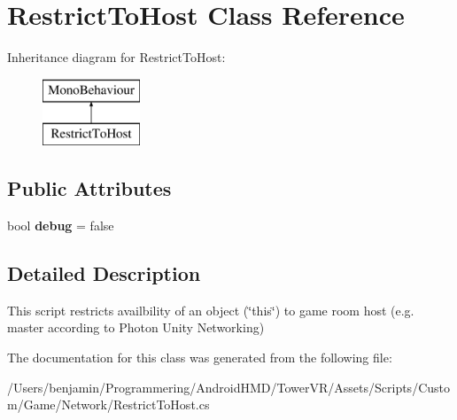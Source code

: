 \hypertarget{class_restrict_to_host}{}\section{Restrict\+To\+Host Class Reference}
\label{class_restrict_to_host}
Inheritance diagram for Restrict\+To\+Host\+:\begin{figure}[H]
\begin{center}
\leavevmode
\includegraphics[height=2.000000cm]{class_restrict_to_host}
\end{center}
\end{figure}
\subsection*{Public Attributes}
\begin{DoxyCompactItemize}
\item 
bool {\bfseries debug} = false\hypertarget{class_restrict_to_host_a23cf17fd15f31f44b9dfcbb92f06e495}{}\label{class_restrict_to_host_a23cf17fd15f31f44b9dfcbb92f06e495}

\end{DoxyCompactItemize}


\subsection{Detailed Description}
This script restricts availbility of an object (\char`\"{}this\char`\"{}) to game room host (e.\+g. master according to Photon Unity Networking) 

The documentation for this class was generated from the following file\+:\begin{DoxyCompactItemize}
\item 
/\+Users/benjamin/\+Programmering/\+Android\+H\+M\+D/\+Tower\+V\+R/\+Assets/\+Scripts/\+Custom/\+Game/\+Network/Restrict\+To\+Host.\+cs\end{DoxyCompactItemize}
